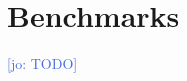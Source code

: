 \documentclass[en]{pracamgr}
\newcommand{\jcom}[1]{\textcolor{RoyalBlue}{[jo: #1]}}
\begin{document}
\chapter{Benchmarks}
\jcom{TODO}


 












\end{document}
